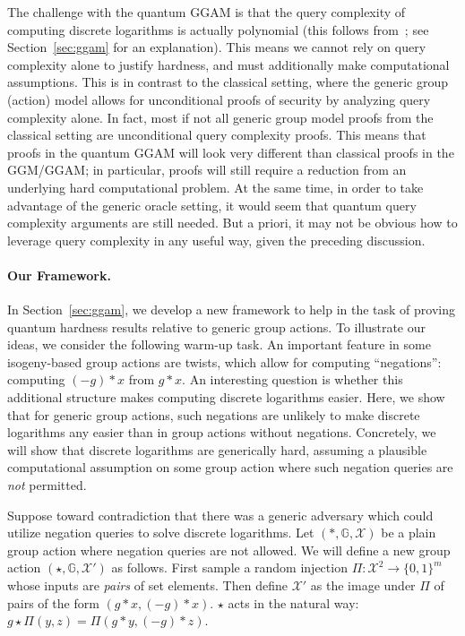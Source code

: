 \documentclass{article}\usepackage[a4paper,margin=20mm]{geometry}
\numberwithin{theorem}{section}
\numberwithin{equation}{section}
\newcommand{\G}{\mathbb{G}}
\newcommand{\Xs}{{\mathcal{X}}}
\begin{document}
The challenge with the quantum GGAM is that the query complexity of computing discrete logarithms is actually polynomial (this follows from~\cite{EttHoy00}; see Section~\ref{sec:ggam} for an explanation). This means we cannot rely on query complexity alone to justify hardness, and must additionally make computational assumptions. This is in contrast to the classical setting, where the generic group (action) model allows for unconditional proofs of security by analyzing query complexity alone. In fact, most if not all generic group model proofs from the classical setting are unconditional query complexity proofs. This means that proofs in the quantum GGAM will look very different than classical proofs in the GGM/GGAM; in particular, proofs will still require a reduction from an underlying hard computational problem. At the same time, in order to take advantage of the generic oracle setting, it would seem that quantum query complexity arguments are still needed. But a priori, it may not be obvious how to leverage query complexity in any useful way, given the preceding discussion.

\paragraph{Our Framework.} In Section~\ref{sec:ggam}, we develop a new framework to help in the task of proving quantum hardness results relative to generic group actions. To illustrate our ideas, we consider the following warm-up task. An important feature in some isogeny-based group actions are twists, which allow for computing ``negations'': computing $(-g)*x$ from $g*x$. An interesting question is whether this additional structure makes computing discrete logarithms easier. Here, we show that for generic group actions, such negations are unlikely to make discrete logarithms any easier than in group actions without negations. Concretely, we will show that discrete logarithms are generically hard, assuming a plausible computational assumption on some group action where such negation queries are \emph{not} permitted. 

Suppose toward contradiction that there was a generic adversary which could utilize negation queries to solve discrete logarithms. Let $(*,\G,\Xs)$ be a plain group action where negation queries are not allowed. We will define a new group action $(\star,\G,\Xs')$ as follows. First sample a random injection $\Pi:\Xs^2\rightarrow\{0,1\}^m$ whose inputs are \emph{pairs} of set elements. Then define $\Xs'$ as the image under $\Pi$ of pairs of the form $(g*x,(-g)*x)$. $\star$ acts in the natural way: $g\star \Pi(y,z)=\Pi(g*y,(-g)*z)$.
\end{document}
